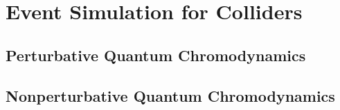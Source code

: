 \chapter{Event Simulation for Colliders}

\section{Perturbative Quantum Chromodynamics}

\section{Nonperturbative Quantum Chromodynamics}